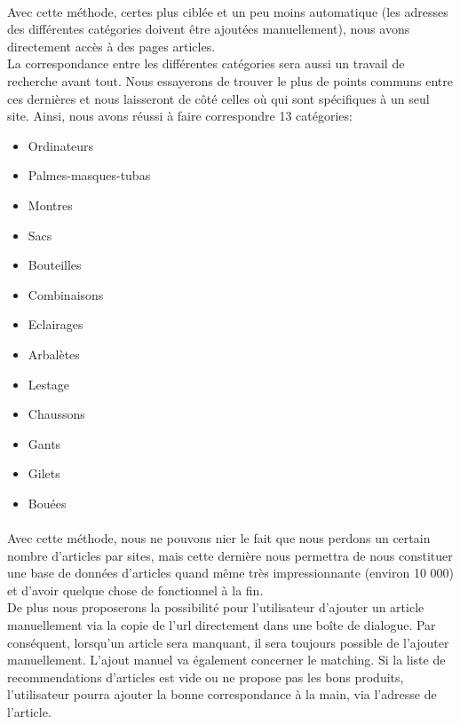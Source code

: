 \documentclass{report}
\begin{document}
\paragraph{}
Avec cette méthode, certes plus ciblée et un peu moins automatique (les adresses des différentes catégories doivent être ajoutées manuellement), nous avons directement accès à des pages articles.\\
La correspondance entre les différentes catégories sera aussi un travail de recherche avant tout. Nous essayerons de trouver le plus de points communs entre ces dernières et nous laisseront de côté celles où qui sont spécifiques à un seul site. Ainsi, nous avons réussi à faire correspondre 13 catégories:

\begin{itemize}
\item Ordinateurs
\item Palmes-masques-tubas
\item Montres
\item Sacs
\item Bouteilles
\item Combinaisons
\item Eclairages
\item Arbalètes
\item Lestage
\item Chaussons
\item Gants
\item Gilets
\item Bouées
\end{itemize}

\paragraph{}
Avec cette méthode, nous ne pouvons nier le fait que nous perdons un certain nombre d'articles par sites, mais cette dernière nous permettra de nous constituer une base de données d'articles quand même très impressionnante (environ 10 000) et d'avoir quelque chose de fonctionnel à la fin.\\
De plus nous proposerons la possibilité pour l'utilisateur d'ajouter un article manuellement via la copie de l'url directement dans une boîte de dialogue. Par conséquent, lorsqu'un article sera manquant, il sera toujours possible de l'ajouter manuellement. L'ajout manuel va également concerner le matching. Si la liste de recommendations d'articles est vide ou ne propose pas les bons produits, l'utilisateur pourra ajouter la bonne correspondance à la main, via l'adresse de l'article.
\end{document}
